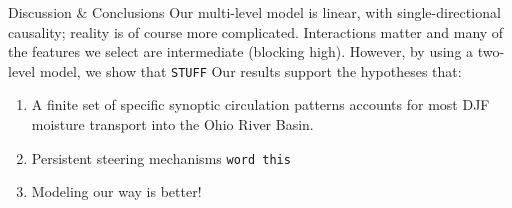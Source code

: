 \begin{block}{Discussion \& Conclusions}
    Our multi-level model is linear, with single-directional causality; reality is of course more complicated.
    Interactions matter and many of the features we select are intermediate (blocking high).
    However, by using a two-level model, we show that \texttt{STUFF}
    Our results support the hypotheses that:
    \begin{enumerate}
        \item A finite set of specific synoptic circulation patterns accounts for most DJF moisture transport into the Ohio River Basin.
        \item Persistent steering mechanisms \texttt{word this}
        \item Modeling our way is better!
    \end{enumerate}
\end{block}
